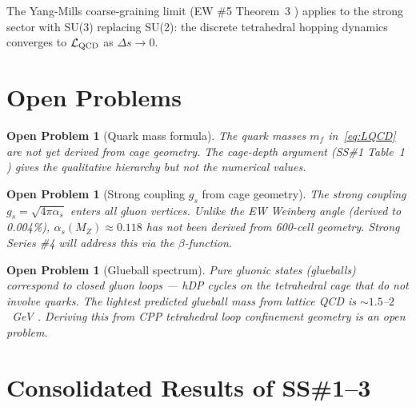 \documentclass[11pt,a4paper]{article}
\newtheorem{openprob}[theorem]{Open Problem}
\newcommand{\as}{\alpha_s}
\begin{document}
The Yang-Mills coarse-graining limit (EW \#5 Theorem~3
\citep{cpp_ew5}) applies to the strong sector with SU(3)
replacing SU(2): the discrete tetrahedral hopping dynamics
converges to $\mathcal{L}_{\rm QCD}$ as $\Delta s \to 0$.

\section{Open Problems}

\begin{openprob}[Quark mass formula]
\label{op:mf}
The quark masses $m_f$ in~\eqref{eq:LQCD} are not yet derived
from cage geometry.  The cage-depth argument (SS\#1
Table~1 \citep{cpp_ss1}) gives the qualitative hierarchy
but not the numerical values.
\end{openprob}

\begin{openprob}[Strong coupling $g_s$ from cage geometry]
\label{op:gs}
The strong coupling $g_s = \sqrt{4\pi\as}$ enters all gluon
vertices.  Unlike the EW Weinberg angle (derived to 0.004\%),
$\as(M_Z) \approx 0.118$ has not been derived from 600-cell
geometry.  Strong Series \#4 will address this via the
$\beta$-function.
\end{openprob}

\begin{openprob}[Glueball spectrum]
\label{op:glueball}
Pure gluonic states (glueballs) correspond to closed gluon loops
--- hDP cycles on the tetrahedral cage that do not involve quarks.
The lightest predicted glueball mass from lattice QCD is
$\sim1.5$--$2$~GeV \citep{morningstar1999}.  Deriving this from
CPP tetrahedral loop confinement geometry is an open problem.
\end{openprob}

\section{Consolidated Results of SS\#1--3}
\end{document}
